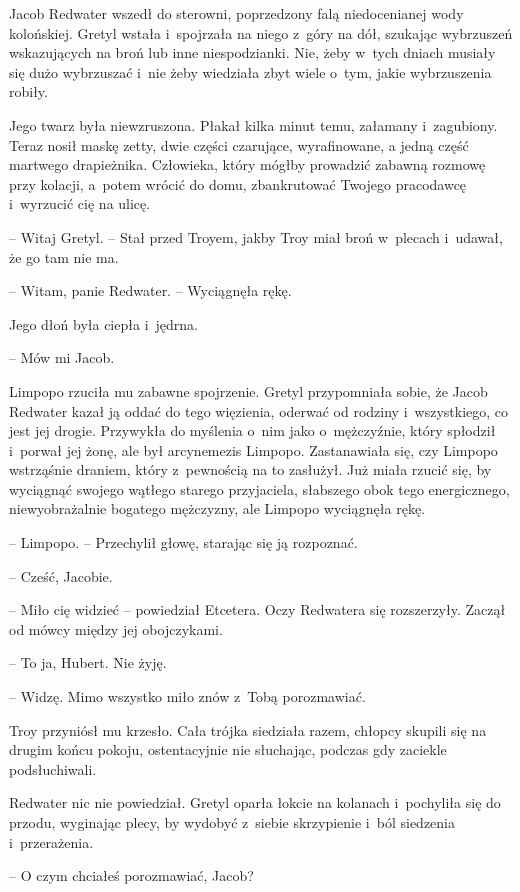 \documentclass[oneside,polish,11pt,sfheadings]{mwbk}
\begin{document}
Jacob Redwater wszedł do sterowni, poprzedzony falą niedocenianej wody
kolońskiej. Gretyl wstała i~spojrzała na niego z~góry na dół, szukając
wybrzuszeń wskazujących na broń lub inne niespodzianki. Nie, żeby w~tych
dniach musiały się dużo wybrzuszać i~nie żeby wiedziała zbyt wiele o~tym, jakie wybrzuszenia robiły.

Jego twarz była niewzruszona. Płakał kilka minut temu, załamany i~zagubiony. Teraz nosił maskę zetty, dwie części czarujące, wyrafinowane,
a jedną część martwego drapieżnika. Człowieka, który mógłby prowadzić
zabawną rozmowę przy kolacji, a~potem wrócić do domu, zbankrutować
Twojego pracodawcę i~wyrzucić cię na ulicę.

-- Witaj Gretyl. -- Stał przed Troyem, jakby Troy miał broń w~plecach i~udawał, że go tam nie ma.

-- Witam, panie Redwater. -- Wyciągnęła rękę.

Jego dłoń była ciepła i~jędrna. 

-- Mów mi Jacob.

Limpopo rzuciła mu zabawne spojrzenie. Gretyl przypomniała sobie, że
Jacob Redwater kazał ją oddać do tego więzienia, oderwać od rodziny i~wszystkiego, co jest jej drogie. Przywykła do myślenia o~nim jako o~mężczyźnie, który spłodził i~porwał jej żonę, ale był arcynemezis
Limpopo. Zastanawiała się, czy Limpopo wstrząśnie draniem, który z~pewnością na to zasłużył. Już miała rzucić się, by wyciągnąć swojego
wątłego starego przyjaciela, słabszego obok tego energicznego,
niewyobrażalnie bogatego mężczyzny, ale Limpopo wyciągnęła rękę.

-- Limpopo. -- Przechylił głowę, starając się ją rozpoznać.

-- Cześć, Jacobie.

-- Miło cię widzieć -- powiedział Etcetera. Oczy Redwatera się
rozszerzyły. Zaczął od mówcy między jej obojczykami. 

-- To ja, Hubert.
Nie żyję.

-- Widzę. Mimo wszystko miło znów z~Tobą porozmawiać.

Troy przyniósł mu krzesło. Cała trójka siedziała razem, chłopcy skupili
się na drugim końcu pokoju, ostentacyjnie nie słuchając, podczas gdy
zaciekle podsłuchiwali.

Redwater nic nie powiedział. Gretyl oparła łokcie na kolanach i~pochyliła się do przodu, wyginając plecy, by wydobyć z~siebie
skrzypienie i~ból siedzenia i~przerażenia. 

-- O czym chciałeś
porozmawiać, Jacob?
\end{document}
